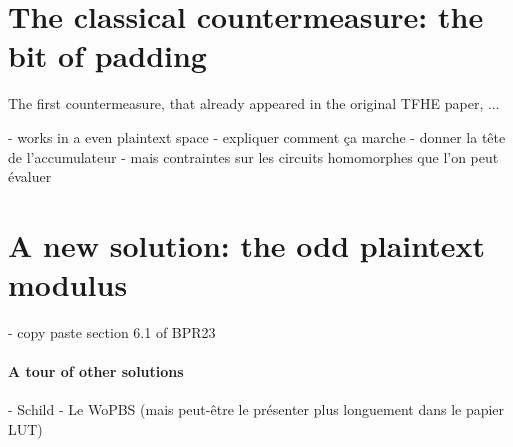 \section{The classical countermeasure: the bit of padding}

The first countermeasure, that already appeared in the original TFHE paper, ...


- works in a even plaintext space
- expliquer comment ça marche
- donner la tête de l'accumulateur
- mais contraintes sur les circuits homomorphes que l'on peut évaluer



\section{A new solution: the odd plaintext modulus}

- copy paste section 6.1 of BPR23



\paragraph{A tour of other solutions}

- Schild
- Le WoPBS (mais peut-être le présenter plus longuement dans le papier LUT)






